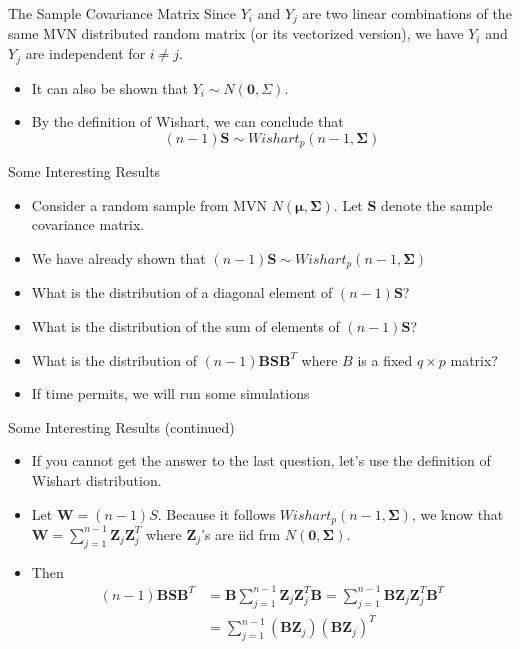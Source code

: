 \documentclass[
  ignorenonframetext,
]{beamer}
\begin{document}
\begin{frame}{The Sample Covariance Matrix}
\protect\hypertarget{the-sample-covariance-matrix-3}{}
Since \(Y_i\) and \(Y_j\) are two linear combinations of the same MVN
distributed random matrix (or its vectorized version), we have \(Y_i\)
and \(Y_j\) are independent for \(i\not=j\).

\begin{itemize}
\item
  It can also be shown that \(Y_i \sim N(\mathbf 0, \Sigma)\).
\item
  By the definition of Wishart, we can conclude that
  \[(n-1)\mathbf S\sim Wishart_p(n-1, \boldsymbol \Sigma)\]
\end{itemize}
\end{frame}

\begin{frame}{Some Interesting Results}
\protect\hypertarget{some-interesting-results}{}
\begin{itemize}
\item
  Consider a random sample from MVN
  \(N(\boldsymbol \mu, \boldsymbol \Sigma)\). Let \(\mathbf S\) denote
  the sample covariance matrix.
\item
  We have already shown that
  \((n-1)\mathbf S \sim Wishart_p(n-1, \boldsymbol \Sigma)\)
\item
  What is the distribution of a diagonal element of \((n-1)\mathbf S\)?
\item
  What is the distribution of the sum of elements of \((n-1)\mathbf S\)?
\item
  What is the distribution of \((n-1)\mathbf B \mathbf S \mathbf B^T\)
  where \(B\) is a fixed \(q\times p\) matrix?
\item
  If time permits, we will run some simulations
\end{itemize}
\end{frame}

\begin{frame}{Some Interesting Results (continued)}
\protect\hypertarget{some-interesting-results-continued}{}
\begin{itemize}
\item
  If you cannot get the answer to the last question, let's use the
  definition of Wishart distribution.
\item
  Let \(\mathbf W = (n-1)S\). Because it follows
  \(Wishart_p(n-1, \boldsymbol\Sigma)\), we know that
  \(\mathbf W=\sum_{j=1}^{n-1} \mathbf Z_j \mathbf Z_j^T\) where
  \(\mathbf Z_j\)'s are iid frm \(N(\mathbf 0, \boldsymbol\Sigma)\).
\item
  Then \[
  \begin{aligned}
  (n-1)\mathbf B \mathbf S \mathbf B^T &= \mathbf B\sum_{j=1}^{n-1} \mathbf Z_j \mathbf Z_j^T\mathbf B = \sum_{j=1}^{n-1} \mathbf B \mathbf Z_j \mathbf Z_j^T\mathbf B^T\\
  &= \sum_{j=1}^{n-1} (\mathbf B \mathbf Z_j)(\mathbf B \mathbf Z_j)^T
  \end{aligned}
  \]
\end{itemize}
\end{frame}
\end{document}

